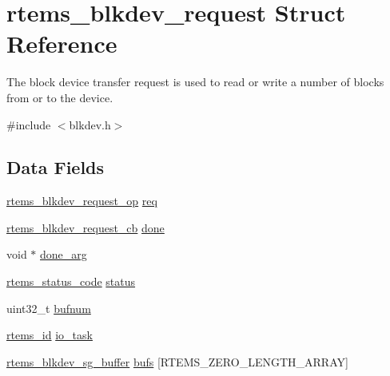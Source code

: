 \hypertarget{structrtems__blkdev__request}{}\section{rtems\+\_\+blkdev\+\_\+request Struct Reference}
\label{structrtems__blkdev__request}


The block device transfer request is used to read or write a number of blocks from or to the device.  




{\ttfamily \#include $<$blkdev.\+h$>$}

\subsection*{Data Fields}
\begin{DoxyCompactItemize}
\item 
\mbox{\hyperlink{group__rtems__blkdev_ga36465495f1b9e28347838751ca90f0fe}{rtems\+\_\+blkdev\+\_\+request\+\_\+op}} \mbox{\hyperlink{structrtems__blkdev__request_a757296b35fdc10cc08c49a555d2873f4}{req}}
\item 
\mbox{\hyperlink{group__rtems__blkdev_ga64a394fd9c40d7e2d1d22441741b6c83}{rtems\+\_\+blkdev\+\_\+request\+\_\+cb}} \mbox{\hyperlink{structrtems__blkdev__request_a765728a8a6a087b5b7f0edaefbf4e070}{done}}
\item 
void $\ast$ \mbox{\hyperlink{structrtems__blkdev__request_a6d5037a53d9c352883dc7f29880df301}{done\+\_\+arg}}
\item 
\mbox{\hyperlink{group__ClassicStatus_ga545d41846817eaba6143d52ee4d9e9fe}{rtems\+\_\+status\+\_\+code}} \mbox{\hyperlink{structrtems__blkdev__request_a7200280756d1db24e67d2ad0437a538b}{status}}
\item 
uint32\+\_\+t \mbox{\hyperlink{structrtems__blkdev__request_a76d2f6b5d6bc71c8cdab127a3f969181}{bufnum}}
\item 
\mbox{\hyperlink{group__ClassicTasks_gab20892b814dced7dd4e5b9bf42becd57}{rtems\+\_\+id}} \mbox{\hyperlink{structrtems__blkdev__request_a53d6bb491e03e4282735168860723d2d}{io\+\_\+task}}
\item 
\mbox{\hyperlink{structrtems__blkdev__sg__buffer}{rtems\+\_\+blkdev\+\_\+sg\+\_\+buffer}} \mbox{\hyperlink{structrtems__blkdev__request_a76108e3fa44f35927541a19db1164016}{bufs}} \mbox{[}R\+T\+E\+M\+S\+\_\+\+Z\+E\+R\+O\+\_\+\+L\+E\+N\+G\+T\+H\+\_\+\+A\+R\+R\+AY\mbox{]}
\end{DoxyCompactItemize}


